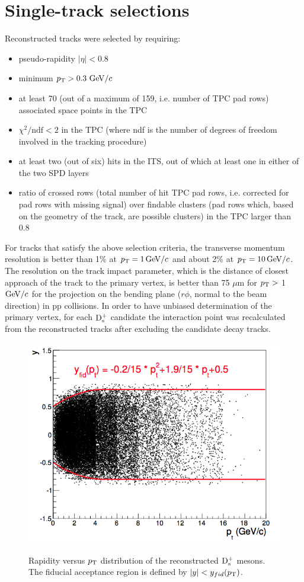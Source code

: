\section{Single-track selections}
Reconstructed tracks were selected by requiring:
\begin{itemize}
\item pseudo-rapidity $|\eta| < 0.8$
\item minimum $p_{\rm T} > 0.3~\mathrm{GeV}/c$
\item at least 70 (out of a maximum of 159, i.e. number of TPC pad rows) 
associated space points in the TPC
\item $\chi^2/\mathrm{ndf} < 2$ in the TPC (where ndf is the number of degrees of 
freedom involved in the tracking procedure)
\item at least two (out of six) hits in the ITS, out of which at least one 
in either of the two SPD layers
\item ratio of crossed rows (total number of hit TPC pad rows, i.e. corrected 
for pad rows with missing signal) over findable clusters (pad rows which, 
based on the geometry of the track, are possible clusters) in the TPC larger than 0.8
\end{itemize}
For tracks that satisfy the above selection criteria, the transverse momentum 
resolution is better than 1$\%$ at $p_{\rm T} = 1\, \mathrm{GeV}/c$ and about 2\% at $p_{\rm T} = 10 \, \mathrm{GeV}/c$. 
The resolution on the track impact parameter, which is the distance of closest 
approach of the track to the primary vertex, is better than 75 $\mu$m for 
$p_{\rm T} >$ 1 $\mathrm{GeV}/c$ for the projection on the bending plane ($r\phi$, normal to 
the beam direction) in pp collisions.
In order to have unbiased determination of the primary vertex, for each 
${\rm D_s^+}$ candidate the interaction point was recalculated from the reconstructed 
tracks after excluding the candidate decay tracks.
\begin{figure}[!htbp]
\begin{center}
\includegraphics[width=.5\textwidth]{FigCap4/YvsPt.png}
\label{fig:singtrafter}
\caption{Rapidity versus $p_{\rm T}$ distribution of the reconstructed ${\rm D_s^+}$ mesons. The fiducial acceptance region is defined by $|y| < y_{fid}(p_{\rm T})$.}
\end{center}
\end{figure}

